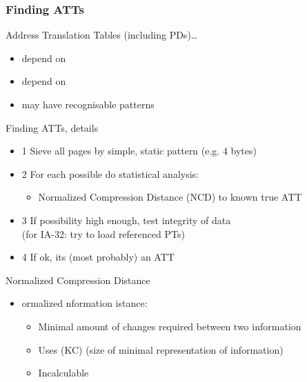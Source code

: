 \documentclass{beamer}
\newenvironment{itemizeframe}[1]
  {\begin{frame}{#1}\startitemizeframe}
  {\stopitemizeframe\end{frame}}
\newcommand\startitemizeframe{\begin{itemize}}
\newcommand\stopitemizeframe{\end{itemize}}
\begin{document}
		\begin{frame} \frametitle{Finding ATTs}
			Address Translation Tables (including PDs)\ldots
			\begin{itemize}
				\item depend on 
				\item depend on 
				\item may have recognisable patterns
			\end{itemize}
		\end{frame}

		\begin{itemizeframe}{Finding ATTs, details}
			\item[1] Sieve all pages by simple, static pattern (e.g. 4 bytes)
			\item[2] For each possible do statistical analysis:
			\begin{itemize}
				\item Normalized Compression Distance (NCD) to known true ATT
			\end{itemize}
			\item[3] If possibility high enough, test integrity of data \\ (for IA-32: try to load referenced PTs)
			\item[4] If ok, its (most probably) an ATT
		\end{itemizeframe}

		\begin{itemizeframe}{Normalized Compression Distance}
			\item {}ormalized nformation istance:
			\begin{itemize}
				\item Minimal amount of changes required between two information
				\item Uses  (KC) (size of minimal representation of information)
				\item Incalculable
			\end{itemize}
		\end{itemizeframe}
\end{document}
